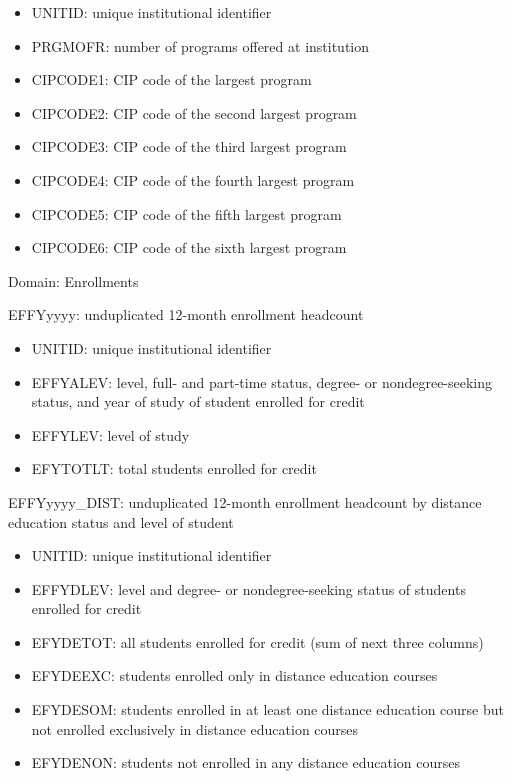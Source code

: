 \documentclass[sigconf, authorversion, nonacm]{acmart}
\begin{document}
    \begin{itemize}
        \item UNITID: unique institutional identifier
        \item PRGMOFR: number of programs offered at institution
        \item CIPCODE1: CIP code of the largest program
        \item CIPCODE2: CIP code of the second largest program
        \item CIPCODE3: CIP code of the third largest program
        \item CIPCODE4: CIP code of the fourth largest program
        \item CIPCODE5: CIP code of the fifth largest program
        \item CIPCODE6: CIP code of the sixth largest program
    \end{itemize}

    Domain: Enrollments

    EFFYyyyy: unduplicated 12-month enrollment headcount

    \begin{itemize}
        \item UNITID: unique institutional identifier
        \item EFFYALEV: level, full- and part-time status, degree- or nondegree-seeking status, and year of study of student enrolled for credit
        \item EFFYLEV: level of study
        \item EFYTOTLT: total students enrolled for credit
    \end{itemize}

    EFFYyyyy_DIST: unduplicated 12-month enrollment headcount by distance education status and level of student

    \begin{itemize}
        \item UNITID: unique institutional identifier
        \item EFFYDLEV: level and degree- or nondegree-seeking status of students enrolled for credit
        \item EFYDETOT: all students enrolled for credit (sum of next three columns)
        \item EFYDEEXC: students enrolled only in distance education courses
        \item EFYDESOM: students enrolled in at least one distance education course but not enrolled exclusively in distance education courses
        \item EFYDENON: students not enrolled in any distance education courses
    \end{itemize}
\end{document}
